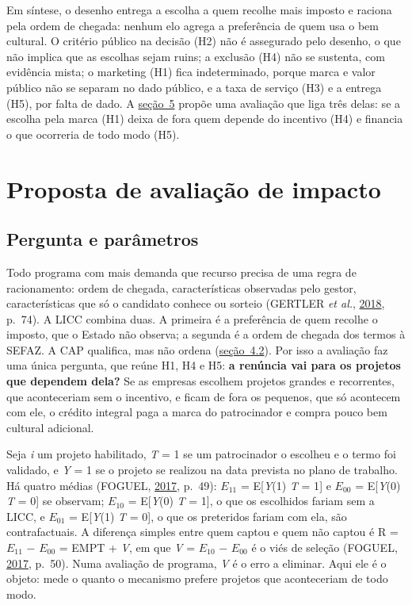 \documentclass[12pt,a4paper]{article}
\begin{document}
Em síntese, o desenho entrega a escolha a quem recolhe mais imposto e raciona pela ordem de chegada:
nenhum elo agrega a preferência de quem usa o bem cultural. O critério público na decisão (H2) não é
assegurado pelo desenho, o que não implica que as escolhas sejam ruins; a exclusão (H4) não se
sustenta, com evidência mista; o marketing (H1) fica indeterminado, porque marca e valor público não
se separam no dado público, e a taxa de serviço (H3) e a entrega (H5), por falta de dado. A \hyperref[secao-5]{seção~5}
propõe uma avaliação que liga três delas: se a escolha pela marca (H1) deixa de fora quem depende do
incentivo (H4) e financia o que ocorreria de todo modo (H5).

\section{Proposta de avaliação de impacto}\label{secao-5}

\subsection{Pergunta e parâmetros}\label{secao-5.1}

Todo programa com mais demanda que recurso precisa de uma regra de racionamento: ordem de chegada,
características observadas pelo gestor, características que só o candidato conhece ou sorteio
(GERTLER \emph{et al.}, \hyperref[ref-gertler-20]{2018}, p.~74). A LICC combina duas. A primeira é a
preferência de quem recolhe o imposto, que o Estado não observa; a segunda é a ordem de chegada dos
termos à SEFAZ. A CAP qualifica, mas não ordena (\hyperref[secao-4.2]{seção~4.2}). Por isso a avaliação faz uma única
pergunta, que reúne H1, H4 e H5: \textbf{a renúncia vai para os projetos que dependem dela?} Se as
empresas escolhem projetos grandes e recorrentes, que aconteceriam sem o incentivo, e ficam de fora
os pequenos, que só acontecem com ele, o crédito integral paga a marca do patrocinador e compra
pouco bem cultural adicional.

Seja \emph{i} um projeto habilitado, \emph{T} = 1 se um patrocinador o escolheu e o termo foi
validado, e \emph{Y} = 1 se o projeto se realizou na data prevista no plano de trabalho. Há quatro
médias (FOGUEL, \hyperref[ref-foguel-18]{2017}, p.~49): \(E_{11}\) = E{[}\emph{Y}(1) \textbar{}
\emph{T} = 1{]} e \(E_{00}\) = E{[}\emph{Y}(0) \textbar{} \emph{T} = 0{]} se observam; \(E_{10}\) =
E{[}\emph{Y}(0) \textbar{} \emph{T} = 1{]}, o que os escolhidos fariam sem a LICC, e \(E_{01}\) =
E{[}\emph{Y}(1) \textbar{} \emph{T} = 0{]}, o que os preteridos fariam com ela, são contrafactuais.
A diferença simples entre quem captou e quem não captou é R = \(E_{11}\) − \(E_{00}\) = EMPT +
\emph{V}, em que \emph{V} = \(E_{10}\) − \(E_{00}\) é o viés de seleção (FOGUEL,
\hyperref[ref-foguel-18]{2017}, p.~50). Numa avaliação de programa, \emph{V} é o erro a eliminar.
Aqui ele é o objeto: mede o quanto o mecanismo prefere projetos que aconteceriam de todo modo.
\end{document}
